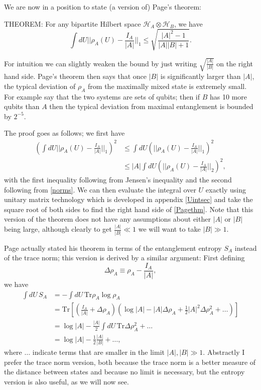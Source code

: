 \documentclass[12pt]{article}
\newcommand{\be}{\begin{equation}}
\newcommand{\ee}{\end{equation}}
\begin{document}
We are now in a position to state (a version of) Page's theorem:

THEOREM: For any bipartite Hilbert space $\mathcal{H}_A\otimes\mathcal{H}_B$, we have
\be\label{Pagethm}
\int dU ||\rho_A(U)-\frac{I_A}{|A|}||_1\leq \sqrt{\frac{|A|^2-1}{|A||B|+1}}.
\ee

For intuition we can slightly weaken the bound by just writing $\sqrt{\frac{|A|}{|B|}}$ on the right hand side.  Page's theorem then says that once $|B|$ is significantly larger than $|A|$, the typical deviation of $\rho_A$ from the maximally mixed state is extremely small.  For example say that the two systems are sets of qubits; then if $B$ has 10 more qubits than $A$ then the typical deviation from maximal entanglement is bounded by $2^{-5}$.  

The proof goes as follows; we first have
\begin{align}\nonumber
\left(\int dU ||\rho_A(U)-\frac{I_A}{|A|}||_1\right)^2&\leq \int dU \left(||\rho_A(U)-\frac{I_A}{|A|}||_1\right)^2\\
&\leq |A|\int dU \left(||\rho_A(U)-\frac{I_A}{|A|}||_2\right)^2,
\end{align}
with the first inequality following from Jensen's inequality and the second following from \eqref{norms}.  We can then evaluate the integral over $U$ exactly using unitary matrix technology which is developed in appendix \ref{Uintsec} and take the square root of both sides to find the right hand side of \eqref{Pagethm}.  Note that this version of the theorem does not have any assumptions about either $|A|$ or $|B|$ being large, although clearly to get $\frac{|A|}{|B|}\ll 1$ we will want to take $|B|\gg 1$.  

Page actually stated his theorem in terms of the entanglement entropy $S_A$ instead of the trace norm; this version is derived by a similar argument: First defining 
\be
\Delta\rho_A\equiv \rho_A-\frac{I_A}{|A|},
\ee
we have
\begin{align}\nonumber
\int dU \, S_A&=-\int dU \,\mathrm{Tr}\rho_A \log \rho_A\\\nonumber
&=\mathrm{Tr}\left[\left(\frac{I_A}{|A|}+\Delta\rho_A\right)\left(\log |A|-|A|\Delta\rho_A+\frac{1}{2}|A|^2 \Delta \rho_A^2+\ldots\right)\right]\\\nonumber
&=\log |A|-\frac{|A|}{2}\int dU \, \mathrm{Tr} \Delta \rho_A^2+\ldots\\
&=\log|A|-\frac{1}{2}\frac{|A|}{|B|}+\ldots,
\end{align}
where $\ldots$ indicate terms that are smaller in the limit $|A|,|B|\gg 1$.  Abstractly I prefer the trace norm version, both because the trace norm is a better measure of the distance between states and because no limit is necessary, but the entropy version is also useful, as we will now see.
\end{document}
